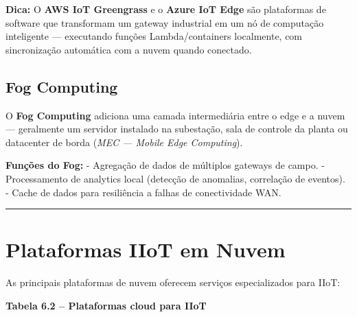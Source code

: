 \begin{caixadica}

\textbf{Dica:} O \textbf{AWS IoT Greengrass} e o \textbf{Azure IoT Edge} são plataformas de software que transformam um gateway industrial em um nó de computação inteligente --- executando funções Lambda/containers localmente, com sincronização automática com a nuvem quando conectado.

\end{caixadica}

\subsection{Fog Computing}\label{fog-computing}

O \textbf{Fog Computing} adiciona uma camada intermediária entre o edge e a nuvem --- geralmente um servidor instalado na subestação, sala de controle da planta ou datacenter de borda (\emph{MEC --- Mobile Edge Computing}).

\textbf{Funções do Fog:}
- Agregação de dados de múltiplos gateways de campo.
- Processamento de analytics local (detecção de anomalias, correlação de eventos).
- Cache de dados para resiliência a falhas de conectividade WAN.

\begin{center}\rule{0.5\linewidth}{0.5pt}\end{center}

\section{Plataformas IIoT em Nuvem}\label{plataformas-iiot-em-nuvem}

As principais plataformas de nuvem oferecem serviços especializados para IIoT:

\textbf{Tabela 6.2 -- Plataformas cloud para IIoT}

